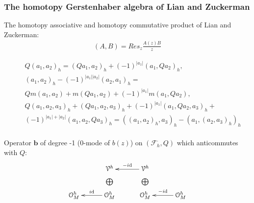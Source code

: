 \documentclass[9pt]{beamer}
\begin{document}
\begin{frame}[t]
\frametitle{The homotopy Gerstenhaber algebra of Lian and Zuckerman}
The homotopy associative and homotopy commutative product of Lian and Zuckerman:
\begin{eqnarray*}
(A,B)=Res_z\frac{A(z)B}{z}
\end{eqnarray*}

\begin{eqnarray*}&&Q(a_1,a_2)_h=(Q a_1,a_2)_h+(-1)^{|a_1|}(a_1,Q a_2)_h,\nonumber\\
&&(a_1,a_2)_h-(-1)^{|a_1||a_2|}(a_2,a_1)_h=\nonumber\\
&&Qm(a_1,a_2)+m(Qa_1,a_2)+(-1)^{|a_1|}m(a_1,Qa_2),\nonumber\\
&& Q(a_1,a_2,a_3)_h+(Qa_1,a_2,a_3)_h+(-1)^{|a_1|}(a_1,Qa_2,a_3)_h+\nonumber\\
&&(-1)^{|a_1|+|a_2|}(a_1,a_2,Qa_3)_h=((a_1,a_2)_h,a_3)_h-(a_1,(a_2,a_3)_h)_h\nonumber\\
\end{eqnarray*}

Operator $\mathbf{b}$ of degree -1 (0-mode of $b(z)$) on 
$(\mathcal{F}_h^{\cdot}, Q)$ which anticommutes with $Q$:  
\begin{eqnarray*}
\xymatrixcolsep{30pt}
\xymatrixrowsep{3pt}
\xymatrix{
& \mathcal{V}^h & \mathcal{V}^h\ar[l]_{-i\rm{d}}& \\
& \bigoplus & \bigoplus & \\
\mathcal{O}_M^{h} & \mathcal{O}_M^{h}\ar[l]_{i\rm{d}} & \mathcal{O}_M^{h}& \mathcal{O}_M^{h}\ar[l]_{-i\rm{d}}
} 
\end{eqnarray*}




\end{frame}

\end{document}
